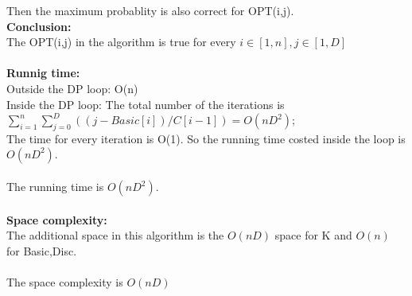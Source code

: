\documentclass{article}
\begin{document}
Then the maximum probablity is also correct for OPT(i,j).\\
\textbf{Conclusion:} \\
The OPT(i,j) in the algorithm is true for every $i \in [1,n], j \in [1,D]$\\\\
\textbf{\large Runnig time:\\}
Outside the DP loop: O(n)\\
Inside the DP loop: The total number of the iterations is  $\sum_{i=1}^n \sum_{j=0}^{D} ((j-Basic[i])/C[i-1])  = O(nD^2)$;\\
The time for every iteration is O(1). So the running time costed inside the loop is $O(nD^2).$\\\\
The running time is $O(nD^2).$\\\\
\textbf{\large Space complexity:\\}
The additional space in this algorithm is the $O(nD)$ space for K and $O(n)$ for Basic,Disc.\\\\
The space complexity is $O(nD)$
\end{document}
